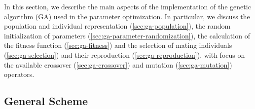 \documentclass[10pt,a4paper,openany]{memoir}
\numberwithin{equation}{section}
\begin{document}
In this section, we describe the main aspects of the implementation of the
genetic algorithm (GA) used in the parameter optimization.  In particular, we
discuss the population and individual representation
(\autoref{sec:ga-population}), the random initialization of parameters
(\autoref{sec:ga-parameter-randomization}), the calculation of the fitness
function (\autoref{sec:ga-fitness}) and the selection of mating individuals
(\autoref{sec:ga-selection}) and their reproduction
(\autoref{sec:ga-reproduction}), with focus on the available crossover
(\autoref{sec:ga-crossover}) and mutation (\autoref{sec:ga-mutation}) operators.

\subsection{General Scheme}
\label{sec:ga-scheme}
\end{document}
